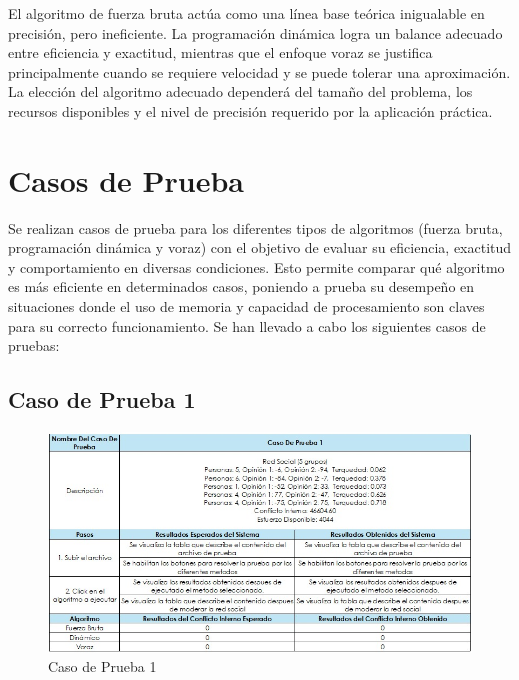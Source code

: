 \documentclass[11pt,letter]{article}
\begin{document}
     \vspace{1em}
    \noindent
    \begin{tcolorbox}[colback=red!5!white, colframe=red!50!black, title=Comparación Global]
        El algoritmo de fuerza bruta actúa como una línea base teórica inigualable en precisión, pero ineficiente. La programación dinámica logra un balance adecuado entre eficiencia y exactitud, mientras que el enfoque voraz se justifica principalmente cuando se requiere velocidad y se puede tolerar una aproximación. La elección del algoritmo adecuado dependerá del tamaño del problema, los recursos disponibles y el nivel de precisión requerido por la aplicación práctica.
    \end{tcolorbox}

    


    \newpage



    \section{Casos de Prueba}

    Se realizan casos de prueba para los diferentes tipos de algoritmos (fuerza bruta, programación dinámica y voraz) con el objetivo de evaluar su eficiencia, exactitud y comportamiento en diversas condiciones. Esto permite comparar qué algoritmo es más eficiente en determinados casos, poniendo a prueba su desempeño en situaciones donde el uso de memoria y capacidad de procesamiento son claves para su correcto funcionamiento. Se han llevado a cabo los siguientes casos de pruebas:

\subsection{Caso de Prueba 1}
\begin{figure}[H]
    \centering
    \includegraphics[width=\linewidth]{resources/cp1.jpeg}
    \caption{Caso de Prueba 1}
    \label{fig:cp1}
\end{figure}
\end{document}
